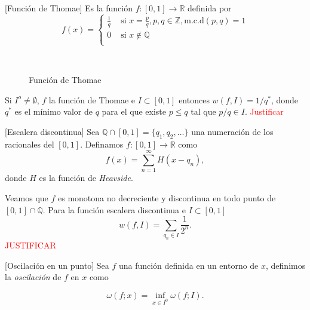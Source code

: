 \begin{ejemplo}{}[Función de Thomae] Es la función $f:[0,1]\to\mathbb{R}$ definida por 
\[
 f(x)=\begin{cases} \frac{1}{q} & \text{ si } x=\frac{p}{q},p,q\in\mathbb{Z}, \text{m.c.d}(p,q)=1
 \\0 & \text{ si }   x\notin\mathbb{Q}\\
\end{cases}
\]

\begin{figure}[H]
\\
\caption{Función de Thomae}
\end{figure}
% 
% 

Si $I^o\neq\emptyset$, $f$ la función de Thomae e $I\subset [0,1]$ entonces 
     $ w(f,I)=1/q^*$, donde $q^*$ es el mínimo valor de $q$ para el que existe $p\leq q$ tal que $p/q\in I$. \textcolor{red}{Justificar}


\end{ejemplo}

 \begin{ejemplo}{}[Escalera discontinua] Sea $\mathbb{Q}\cap [0,1]=\{q_1,q_2,\ldots\}$ una numeración de los racionales del $[0,1]$. Definamos $f:[0,1]\to\mathbb{R}$ como
 \[
  f(x)=\sum_{n=1}^{\infty}H(x-q_n),
 \]
donde $H$ es la función de \emph{Heavside}. 

Veamos que $f$ es monotona no decreciente y discontinua en todo punto de $[0,1]\cap \mathbb{Q}$. 
 Para la función escalera discontinua e $I\subset [0,1]$
  \[
   w(f,I)=\sum_{q_n\in I}\frac{1}{2^n}.
  \]
  \textcolor{red}{JUSTIFICAR}


\end{ejemplo}










\begin{definicion}{}[Oscilación en un punto] Sea $f$ una función definida en un entorno de $x$, definimos la  \emph{oscilación} de $f$ en $x$ como

\[
 \omega(f;x)=\inf\limits_{x\in I^0}\omega(f;I).
\]

 
\end{definicion}

